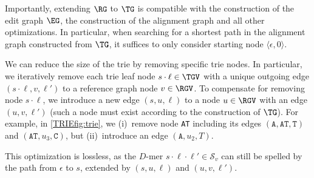 Importantly, extending $\RG$ to $\TG$ is compatible with the construction of the
edit graph $\EG$, the construction of the alignment graph and all other
optimizations. In particular, when searching for a shortest path in the
alignment graph constructed from $\TG$, it suffices to only consider starting
node $\langle \epsilon, 0 \rangle$.

 \label{TRIEpara:reducing_trie}
We can reduce the size of the trie by removing specific trie nodes.
%
In particular, we iteratively remove each trie leaf node $s \cdot \ell \in \TGV$ with a unique outgoing edge $(s \cdot \ell, v, \ell')$ to a reference graph node $v \in \RGV$.
%
To compensate for removing node $s \cdot \ell$, we introduce a new edge $(s, u, \ell)$ to a node $u \in \RGV$ with an edge $(u,v,\ell')$ (such a node must exist according to the construction of $\TG$).
%
For example, in \cref{TRIEfig:trie}, we (i)~remove node \texttt{AT} including its edges $(\texttt{A},\texttt{AT},\texttt{T})$ and $(\texttt{AT},u_3,\texttt{C})$, but (ii)~introduce an edge $(\texttt{A},u_2,T)$.

This optimization is lossless, as the $D$-mer $s \cdot \ell \cdot \ell' \in \mathcal{S}_v$ can still be spelled by the path from $\epsilon$ to $s$, extended by $(s, u, \ell)$ and $(u, v, \ell')$.